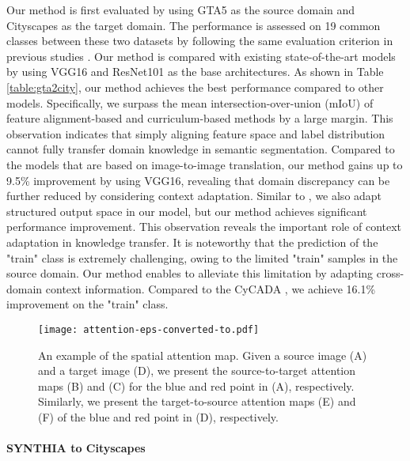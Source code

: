 \documentclass[10pt,twocolumn,letterpaper]{article}
\begin{document}
	Our method is first evaluated by using GTA5 as the source domain and Cityscapes as the target domain. The performance is assessed on 19 common classes between these two datasets by following the same evaluation criterion in previous studies \cite{li2019bidirectional, chen2019crdoco}. Our method is compared with existing state-of-the-art models by using VGG16 and ResNet101 as the base architectures. As shown in Table \ref{table:gta2city}, our method achieves the best performance compared to other models. Specifically, we surpass the mean intersection-over-union (mIoU) of feature alignment-based \cite{hoffman2016fcns, sankaranarayanan2018learning, luo2019taking} and curriculum-based methods \cite{zhang2017curriculum} by a large margin. This observation indicates that simply aligning feature space and label distribution cannot fully transfer domain knowledge in semantic segmentation. Compared to the models \cite{hoffman2017cycada, chen2019crdoco, li2019bidirectional} that are based on image-to-image translation, our method gains up to 9.5\% improvement by using VGG16, revealing that domain discrepancy can be further reduced by considering context adaptation. Similar to \cite{tsai2018learning, li2019bidirectional}, we also adapt structured output space in our model, but our method achieves significant performance improvement. This observation reveals the important role of context adaptation in knowledge transfer. It is noteworthy that the prediction of the "train" class is extremely challenging, owing to the limited "train" samples in the source domain. Our method enables to alleviate this limitation by adapting cross-domain context information. Compared to the CyCADA \cite{hoffman2017cycada}, we achieve 16.1\% improvement on the "train" class.

	\begin{figure}[t]
		\begin{center}
			\texttt{[image: attention-eps-converted-to.pdf]}
		\end{center}
		\caption{An example of the spatial attention map. Given a source image (A) and a target image (D), we present the source-to-target attention maps (B) and (C) for the blue and red point in (A), respectively. Similarly, we present the target-to-source attention maps (E) and (F) of the blue and red point in (D), respectively. }
		\label{fig:spatial_attention_map}
		\vspace{-0.2in}
	\end{figure}


	\paragraph{SYNTHIA to Cityscapes}
\end{document}
